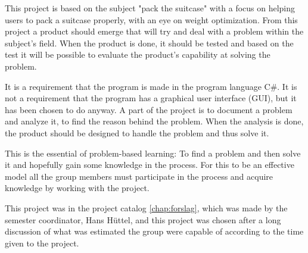This project is based on the subject "pack the suitcase" with a focus on helping users to pack a suitcase properly, with an eye on weight optimization. From this project a product should emerge that will try and deal with a problem within the subject's field. When the product is done, it should be tested and based on the test it will be possible to evaluate the product's capability at solving the problem.

It is a requirement that the program is made in the program language C\#. It is not a requirement that the program has a graphical user interface (GUI), but it has been chosen to do anyway.
A part of the project is to document a problem and analyze it, to find the reason behind the problem. When the analysis is done, the product should be designed to handle the problem and thus solve it.

This is the essential of problem-based learning: To find a problem and then solve it and hopefully gain some knowledge in the process.
For this to be an effective model all the group members must participate in the process and acquire knowledge by working with the project.

This project was in the project catalog \ref{chap:forslag}, which was made by the semester coordinator, Hans Hüttel, and this project was chosen after a long discussion of what was estimated the group were capable of according to the time given to the project.